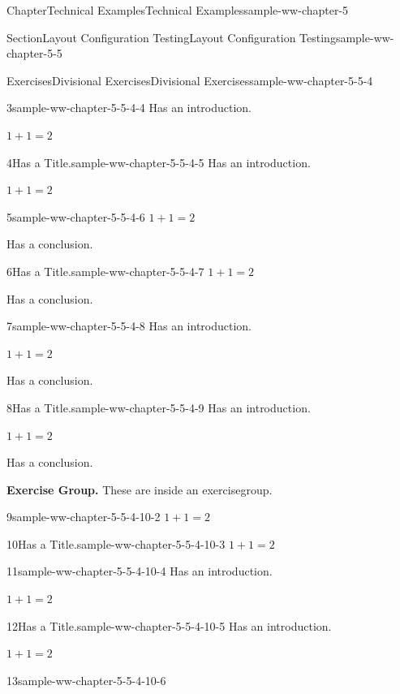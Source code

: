\documentclass[oneside,10pt,]{book}
\numberwithin{equation}{section}
\begin{document}
\begin{chapterptx}{Chapter}{Technical Examples}{}{Technical Examples}{}{}{sample-ww-chapter-5}
\begin{sectionptx}{Section}{Layout Configuration Testing}{}{Layout Configuration Testing}{}{}{sample-ww-chapter-5-5}
\begin{exercises-subsection}{Exercises}{Divisional Exercises}{}{Divisional Exercises}{}{}{sample-ww-chapter-5-5-4}
\begin{divisionexercise}{3}{}{}{sample-ww-chapter-5-5-4-4}
Has an introduction.%
\par
\(1+1=2\)%
\end{divisionexercise}%
\begin{divisionexercise}{4}{Has a Title.}{}{sample-ww-chapter-5-5-4-5}%
Has an introduction.%
\par
\(1+1=2\)%
\end{divisionexercise}%
\begin{divisionexercise}{5}{}{}{sample-ww-chapter-5-5-4-6}%
\(1+1=2\)%
\par
Has a conclusion.%
\end{divisionexercise}%
\begin{divisionexercise}{6}{Has a Title.}{}{sample-ww-chapter-5-5-4-7}%
\(1+1=2\)%
\par
Has a conclusion.%
\end{divisionexercise}%
\begin{divisionexercise}{7}{}{}{sample-ww-chapter-5-5-4-8}%
Has an introduction.%
\par
\(1+1=2\)%
\par
Has a conclusion.%
\end{divisionexercise}%
\begin{divisionexercise}{8}{Has a Title.}{}{sample-ww-chapter-5-5-4-9}%
Has an introduction.%
\par
\(1+1=2\)%
\par
Has a conclusion.%
\end{divisionexercise}%
\par\medskip\noindent%
\textbf{Exercise Group.}\space\space%
These are inside an exercisegroup.%
\begin{exercisegroup}
\begin{divisionexerciseeg}{9}{}{}{sample-ww-chapter-5-5-4-10-2}%
\(1+1=2\)%
\end{divisionexerciseeg}%
\begin{divisionexerciseeg}{10}{Has a Title.}{}{sample-ww-chapter-5-5-4-10-3}%
\(1+1=2\)%
\end{divisionexerciseeg}%
\begin{divisionexerciseeg}{11}{}{}{sample-ww-chapter-5-5-4-10-4}%
Has an introduction.%
\par
\(1+1=2\)%
\end{divisionexerciseeg}%
\begin{divisionexerciseeg}{12}{Has a Title.}{}{sample-ww-chapter-5-5-4-10-5}%
Has an introduction.%
\par
\(1+1=2\)%
\end{divisionexerciseeg}%
\begin{divisionexerciseeg}{13}{}{}{sample-ww-chapter-5-5-4-10-6}%

\end{divisionexerciseeg}
\end{exercisegroup}
\end{exercises-subsection}
\end{sectionptx}
\end{chapterptx}
\end{document}

